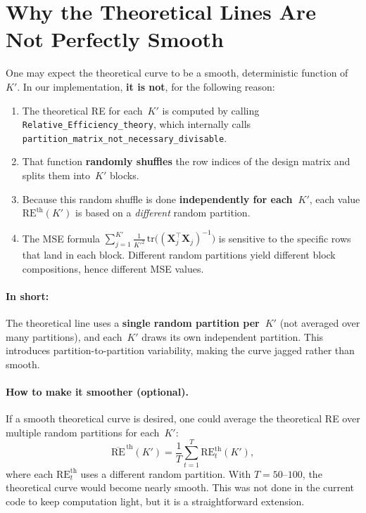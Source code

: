 \documentclass[11pt,a4paper]{article}
\newcommand{\bX}{\mathbf{X}}
\newcommand{\RE}{\mathrm{RE}}
\newcommand{\tr}{\mathrm{tr}}
\begin{document}
\section{Why the Theoretical Lines Are Not Perfectly Smooth}
\label{sec:not-straight}

One may expect the theoretical curve to be a smooth, deterministic function of~$K'$.
In our implementation, \textbf{it is not}, for the following reason:

\begin{enumerate}[label=\textbf{(\alph*)}]
  \item The theoretical RE for each~$K'$ is computed by calling
        \texttt{Relative\_Efficiency\_theory}, which internally calls
        \texttt{partition\_matrix\_not\_necessary\_divisable}.

  \item That function \textbf{randomly shuffles} the row indices of the design
        matrix and splits them into~$K'$ blocks.

  \item Because this random shuffle is done \textbf{independently for each~$K'$},
        each value $\RE^{\mathrm{th}}(K')$ is based on a \emph{different}
        random partition.

  \item The MSE formula
        $\sum_{j=1}^{K'} \frac{1}{K'^2}\,\tr\!\bigl((\bX_j^\top \bX_j)^{-1}\bigr)$
        is sensitive to the specific rows that land in each block.
        Different random partitions yield different block compositions, hence
        different MSE values.
\end{enumerate}

\paragraph{In short:}
The theoretical line uses a \textbf{single random partition per~$K'$} (not averaged
over many partitions), and each~$K'$ draws its own independent partition.
This introduces partition-to-partition variability, making the curve jagged
rather than smooth.

\paragraph{How to make it smoother (optional).}
If a smooth theoretical curve is desired, one could average the theoretical RE
over multiple random partitions for each~$K'$:
\[
  \overline{\RE}^{\,\mathrm{th}}(K')
  = \frac{1}{T} \sum_{t=1}^{T} \RE^{\mathrm{th}}_t(K'),
\]
where each $\RE^{\mathrm{th}}_t$ uses a different random partition.
With $T = 50$--$100$, the theoretical curve would become nearly smooth.
This was not done in the current code to keep computation light, but it is a
straightforward extension.
\end{document}
